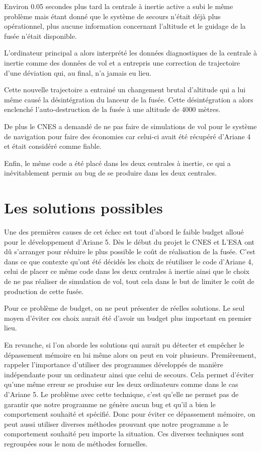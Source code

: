 \documentclass[12pt]{report}
\begin{document}
Environ 0.05 secondes plus tard la centrale à inertie active a subi le même problème mais étant donné que le système de secours n'était déjà plus opérationnel, plus aucune information concernant l'altitude et le guidage de la fusée n'était disponible.   

L'ordinateur principal a alors interprété les données diagnostiques de la centrale à inertie comme des données de vol et a entrepris une correction de trajectoire d'une déviation qui, au final, n'a jamais eu lieu.
  
Cette nouvelle trajectoire a entrainé un changement brutal d'altitude qui a lui même causé la désintégration du lanceur de la fusée. Cette désintégration a alors  enclenché l'auto-destruction de la fusée à une altitude de 4000 mètres.

De plus le \gls{CNES} a demandé de ne pas faire de simulations de vol pour le système de navigation pour faire des économies car celui-ci avait été récupéré d'Ariane 4 et était considéré comme fiable.

Enfin, le même code a été placé dans les deux centrales à inertie, ce qui a inévitablement permis au bug de se produire dans les deux centrales. 

\section{Les solutions possibles}
Une des premières causes de cet échec est tout d'abord le faible budget alloué pour le développement d'Ariane 5.
Dès le début du projet le CNES et L'\gls{ESA} ont dû s'arranger pour réduire le plus possible le coût de réalisation de la fusée. C'est dans ce que contexte qu'ont été décidés les choix de réutiliser le code d'Ariane 4, celui de placer ce même code dans les deux centrales à inertie ainsi que le choix de ne pas réaliser de simulation de vol, tout cela dans le but de limiter le coût de production de cette fusée.

Pour ce problème de budget, on ne peut présenter de réelles solutions. Le seul moyen d'éviter ces choix aurait été d'avoir un budget plus important en premier lieu.

En revanche, si l'on aborde les solutions qui aurait pu détecter et empêcher le dépassement mémoire en lui même alors on peut en voir plusieurs. Premièrement, rappeler l'importance d'utiliser des programmes développés de manière indépendante pour un ordinateur ainsi que celui de secours. Cela permet d'éviter qu'une même erreur se produise sur les deux ordinateurs comme dans le cas d'Ariane 5. Le problème avec cette technique, c'est qu'elle ne permet pas de garantir que notre programme ne génère aucun bug et qu'il a bien le comportement souhaité et spécifié. Donc pour éviter ce dépassement mémoire, on peut aussi utiliser diverses méthodes prouvant que notre programme a le comportement souhaité peu importe la situation. Ces diverses techniques sont regroupées sous le nom de méthodes formelles. 
\end{document}
